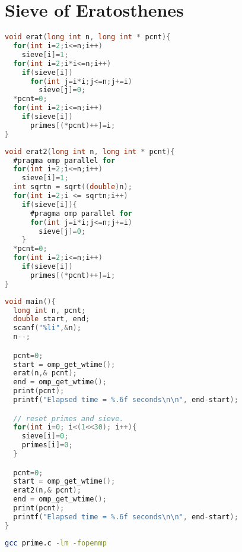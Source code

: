 \documentclass[12pt]{article}
\begin{document}
\section*{Sieve of Eratosthenes}
\begin{lstlisting}[frame=single,language=C,caption=Non-parallelized Sieve of Eratosthenes (prime.c) \label{code:prime-sieve-nonparallelized}]
void erat(long int n, long int * pcnt){
  for(int i=2;i<=n;i++)
    sieve[i]=1;
  for(int i=2;i*i<=n;i++)
    if(sieve[i])
      for(int j=i*i;j<=n;j+=i)
        sieve[j]=0;
  *pcnt=0;
  for(int i=2;i<=n;i++)
    if(sieve[i])
      primes[(*pcnt)++]=i; 
}
\end{lstlisting}
\begin{lstlisting}[frame=single,language=C,caption=Parllelized Sieve of Eratosthenes (prime.c) \label{code:prime-sieve-parallelized}]
void erat2(long int n, long int * pcnt){
  #pragma omp parallel for
  for(int i=2;i<=n;i++)
    sieve[i]=1;
  int sqrtn = sqrt((double)n);
  for(int i=2;i <= sqrtn;i++)
    if(sieve[i]){
      #pragma omp parallel for
      for(int j=i*i;j<=n;j+=i)
        sieve[j]=0;
    }
  *pcnt=0;
  for(int i=2;i<=n;i++)
    if(sieve[i])
      primes[(*pcnt)++]=i; 
}
\end{lstlisting}
\newpage
\begin{lstlisting}[frame=single,language=C,caption=Measuring Runtime Performance (prime.c) \label{code:prime-sieve-runtime}]
void main(){
  long int n, pcnt;
  double start, end;
  scanf("%li",&n);
  n--;

  pcnt=0;
  start = omp_get_wtime();
  erat(n,& pcnt);
  end = omp_get_wtime();
  print(pcnt);
  printf("Elapsed time = %.6f seconds\n\n", end-start);

  // reset primes and sieve.
  for(int i=0; i<(1<<30); i++){
    sieve[i]=0;
    primes[i]=0;
  }

  pcnt=0;
  start = omp_get_wtime();
  erat2(n,& pcnt);
  end = omp_get_wtime();
  print(pcnt);
  printf("Elapsed time = %.6f seconds\n\n", end-start);
}
\end{lstlisting}
\begin{lstlisting}[frame=single,language=Bash,caption=Output in Terminal from prime sieve program (prime.c) \label{code:prime-sieve-terminal-output}]
 gcc prime.c -lm -fopenmp
\end{lstlisting}
\newpage
\end{document}
